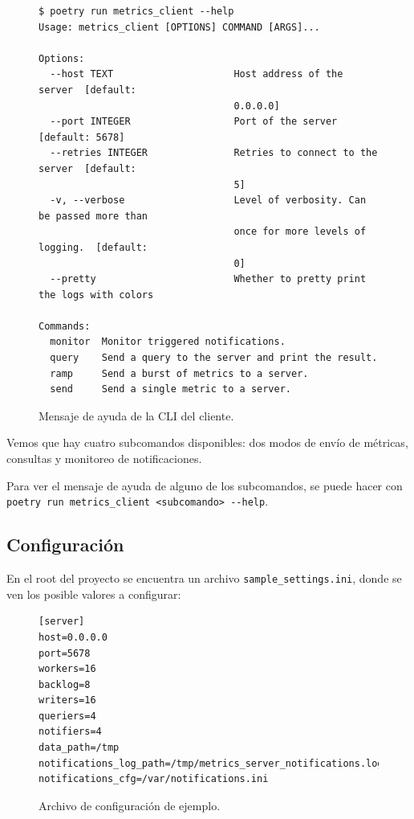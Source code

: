 \documentclass[titlepage,a4paper,oneside]{article}
\begin{document}
\begin{figure}[H]
\begin{verbatim}
$ poetry run metrics_client --help
Usage: metrics_client [OPTIONS] COMMAND [ARGS]...

Options:
  --host TEXT                     Host address of the server  [default:
                                  0.0.0.0]
  --port INTEGER                  Port of the server  [default: 5678]
  --retries INTEGER               Retries to connect to the server  [default:
                                  5]
  -v, --verbose                   Level of verbosity. Can be passed more than
                                  once for more levels of logging.  [default:
                                  0]
  --pretty                        Whether to pretty print the logs with colors

Commands:
  monitor  Monitor triggered notifications.
  query    Send a query to the server and print the result.
  ramp     Send a burst of metrics to a server.
  send     Send a single metric to a server.
\end{verbatim}
\caption{Mensaje de ayuda de la CLI del cliente.}
\end{figure}

Vemos que hay cuatro subcomandos disponibles: dos modos de envío de métricas, consultas y monitoreo de notificaciones.

Para ver el mensaje de ayuda de alguno de los subcomandos, se puede hacer con \texttt{poetry run metrics\_client <subcomando> \--\--help}.

\subsection{Configuración} \label{configuracion}
En el root del proyecto se encuentra un archivo \texttt{sample\_settings.ini}, donde se ven los posible valores a configurar:

\begin{figure}[H]
\begin{verbatim}
[server]
host=0.0.0.0
port=5678
workers=16
backlog=8
writers=16
queriers=4
notifiers=4
data_path=/tmp
notifications_log_path=/tmp/metrics_server_notifications.log
notifications_cfg=/var/notifications.ini
\end{verbatim}
\caption{Archivo de configuración de ejemplo.}
\end{figure}
\end{document}
